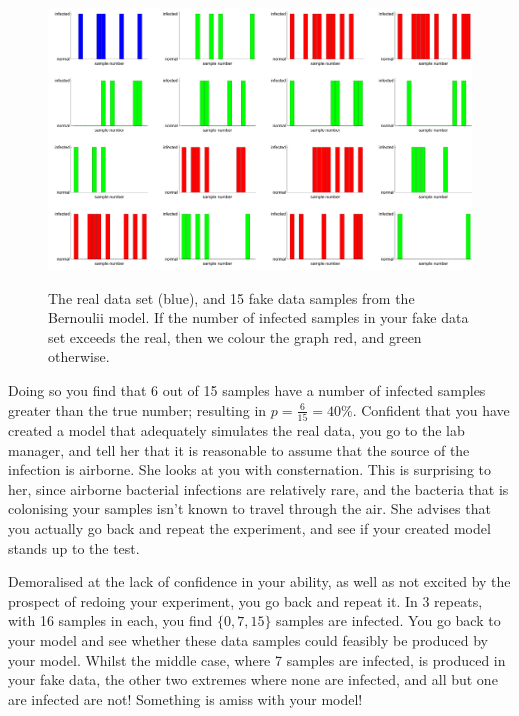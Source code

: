 \documentclass[11pt,fullpage]{book}
\begin{document}
\begin{figure}
\centering
\scalebox{0.25} 
{\includegraphics{Evaluation_bacteriaPPC.pdf}}
\caption{The real data set (blue), and 15 fake data samples from the Bernoulii model. If the number of infected samples in your fake data set exceeds the real, then we colour the graph red, and green otherwise.}\label{fig:Evaluation_bacteriaPPC}
\end{figure}

Doing so you find that 6 out of 15 samples have a number of infected samples greater than the true number; resulting in $p=\frac{6}{15}=40\%$. Confident that you have created a model that adequately simulates the real data, you go to the lab manager, and tell her that it is reasonable to assume that the source of the infection is airborne. She looks at you with consternation. This is surprising to her, since airborne bacterial infections are relatively rare, and the bacteria that is colonising your samples isn't known to travel through the air. She advises that you actually go back and repeat the experiment, and see if your created model stands up to the test.

Demoralised at the lack of confidence in your ability, as well as not excited by the prospect of redoing your experiment, you go back and repeat it. In 3 repeats, with 16 samples in each, you find $\{0,7,15\}$ samples are infected. You go back to your model and see whether these data samples could feasibly be produced by your model. Whilst the middle case, where 7 samples are infected, is produced in your fake data, the other two extremes where none are infected, and all but one are infected are not! Something is amiss with your model!
\end{document}
